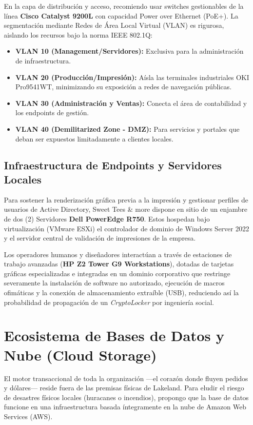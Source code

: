 \documentclass[11pt,a4paper]{article}
\begin{document}
En la capa de distribución y acceso, recomiendo usar switches gestionables de la línea \textbf{Cisco Catalyst 9200L} con capacidad Power over Ethernet (PoE+). La segmentación mediante Redes de Área Local Virtual (VLAN) es rigurosa, aislando los recursos bajo la norma IEEE 802.1Q:
\begin{itemize}
    \item \textbf{VLAN 10 (Management/Servidores):} Exclusiva para la administración de infraestructura.
    \item \textbf{VLAN 20 (Producción/Impresión):} Aísla las terminales industriales OKI Pro9541WT, minimizando su exposición a redes de navegación públicas.
    \item \textbf{VLAN 30 (Administración y Ventas):} Conecta el área de contabilidad y los endpoints de gestión.
    \item \textbf{VLAN 40 (Demilitarized Zone - DMZ):} Para servicios y portales que deban ser expuestos limitadamente a clientes locales.
\end{itemize}

\subsection{Infraestructura de Endpoints y Servidores Locales}
Para sostener la renderización gráfica previa a la impresión y gestionar perfiles de usuarios de Active Directory, Sweet Tees \& more dispone en sitio de un enjambre de dos (2) Servidores \textbf{Dell PowerEdge R750}. Estos hospedan bajo virtualización (VMware ESXi) el controlador de dominio de Windows Server 2022 y el servidor central de validación de impresiones de la empresa.

Los operadores humanos y diseñadores interactúan a través de estaciones de trabajo avanzadas (\textbf{HP Z2 Tower G9 Workstations}), dotadas de tarjetas gráficas especializadas e integradas en un dominio corporativo que restringe severamente la instalación de software no autorizado, ejecución de macros ofimáticas y la conexión de almacenamiento extraíble (USB), reduciendo así la probabilidad de propagación de un \textit{CryptoLocker} por ingeniería social.

\section{Ecosistema de Bases de Datos y Nube (Cloud Storage)}

El motor transaccional de toda la organización —el corazón donde fluyen pedidos y dólares— reside fuera de las premisas físicas de Lakeland. Para eludir el riesgo de desastres físicos locales (huracanes o incendios), propongo que la base de datos funcione en una infraestructura basada íntegramente en la nube de Amazon Web Services (AWS).
\end{document}
